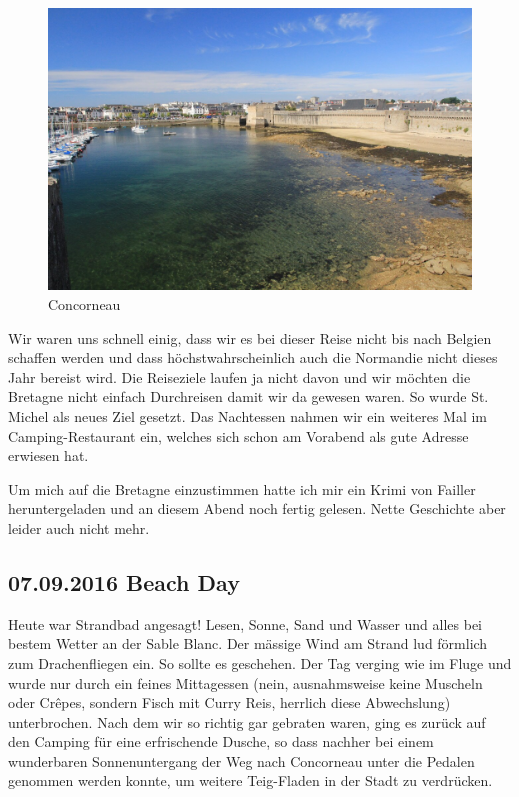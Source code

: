 \begin{figure}[H]
    \centering
    \includegraphics[width=\textwidth]{../Bilder/Bretagne/28.jpg}
    \caption{Concorneau}
    \label{img:Concorneau}
\end{figure}

Wir waren uns schnell einig, dass wir es bei dieser Reise nicht bis nach Belgien schaffen werden und dass höchstwahrscheinlich auch die Normandie nicht dieses Jahr bereist wird.
Die Reiseziele laufen ja nicht davon und wir möchten die Bretagne nicht einfach Durchreisen damit wir da gewesen waren.
So wurde St. Michel als neues Ziel gesetzt.
Das Nachtessen nahmen wir ein weiteres Mal im Camping-Restaurant ein, welches sich schon am Vorabend als gute Adresse erwiesen hat.

Um mich auf die Bretagne einzustimmen hatte ich mir ein Krimi von Failler heruntergeladen und an diesem Abend noch fertig gelesen.
Nette Geschichte aber leider auch nicht mehr.


\subsection{07.09.2016 Beach Day}
Heute war Strandbad angesagt! Lesen, Sonne, Sand und Wasser und alles bei bestem Wetter an der Sable Blanc.
Der mässige Wind am Strand lud förmlich zum Drachenfliegen ein.
So sollte es geschehen.
Der Tag verging wie im Fluge und wurde nur durch ein feines Mittagessen (nein, ausnahmsweise keine Muscheln oder Cr\^{e}pes, sondern Fisch mit Curry Reis, herrlich diese Abwechslung) unterbrochen.
Nach dem wir so richtig gar gebraten waren, ging es zurück auf den Camping für eine erfrischende Dusche, so dass nachher bei einem wunderbaren Sonnenuntergang der Weg nach Concorneau unter die Pedalen genommen werden konnte, um weitere Teig-Fladen in der Stadt zu verdrücken.

